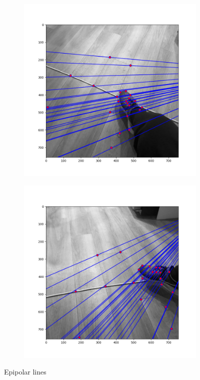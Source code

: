 \documentclass[12pt]{article}
\begin{document}
		\begin{figure}[ht!]
			\centering
			\begin{subfigure}[b]{0.4\textwidth}
				\includegraphics[width=\textwidth]{line1.png}
			\end{subfigure}
			\begin{subfigure}[b]{0.4\textwidth}
				\includegraphics[width=\textwidth]{line2.png}
			\end{subfigure}
			
			\caption{Epipolar lines}
		\end{figure}
\end{document}
